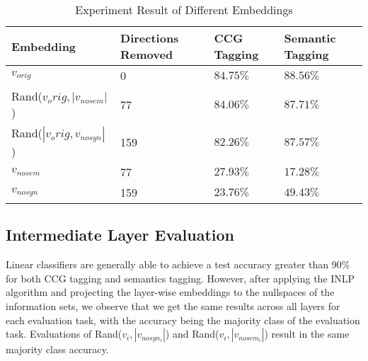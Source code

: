 \documentclass[11pt,a4paper]{article}
\begin{document}
\begin{table*}[h]
    \centering
    \begin{tabular}{llll}
    \hline
    \textbf{Embedding} & \textbf{Directions Removed} & \textbf{CCG Tagging} &\textbf{Semantic Tagging} \\
    \hline
    $v_{orig}$ & 0 & $84.75\%$ & $88.56\%$ \\
    \hline

    Rand($v_orig, |v_{nosem}|$) & 77 & $84.06\%$ & $87.71\%$ \\
    Rand($|v_orig, v_{nosyn}|$) & 159 & $82.26\%$ & $87.57\%$ \\
    \hline
    $v_{nosem}$ & 77 & $27.93\%$ & $17.28\%$ \\
    $v_{nosyn}$ & 159 & $23.76\%$ & $49.43\%$ \\
    \hline
    \hline
    \end{tabular}
    \caption{\label{role description} Experiment Result of Different Embeddings
    }
    \end{table*}

\subsection{Intermediate Layer Evaluation}

Linear classifiers are generally able to achieve a test accuracy greater than 90\% for both CCG tagging and semantics tagging. However, after applying the INLP algorithm and projecting the layer-wise embeddings to the nullspaces of the information sets, we observe that we get the same results across all layers for each evaluation task, with the accuracy being the majority class of the evaluation task. Evaluations of Rand($v_i, |v_{nosyn_i}|$) and Rand($v_i, |v_{nosem_i}|$) result in the same majority class accuracy.
\end{document}
